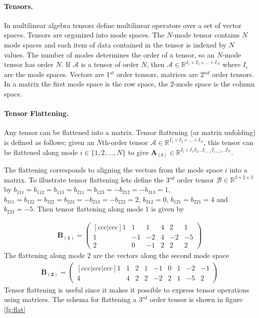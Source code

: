 \documentclass[11pt,a4paper]{report}
\begin{document}
\paragraph{Tensors.} In multilinear algebra tensors
define multilinear operators over a set of vector
spaces. Tensors are organized into mode spaces. The $N$-mode tensor contains $N$
mode spaces and each item of data contained in the tensor is indexed by $N$
values. The number of modes determines the order of a tensor, so an $N$-mode tensor has order $N$. If
$\mathcal{A}$ is a tensor of
order $N$, then $\mathcal{A} \in \mathbb{R}^{I_1 \times I_2 \times \ldots \times
  I_N}$ where $I_i$ are the mode spaces. Vectors are 1$^{st}$ order tensors, matrices are 2$^{nd}$ order
tensors. In a matrix the first mode space is the row space, the $2$-mode space
is the column space.

\paragraph{Tensor Flattening.} Any tensor can be flattened into a matrix. Tensor
flattening (or matrix unfolding) is defined as follows; given
an $N$th-order tensor $\mathcal{A} \in \mathbb{R}^{I_1 \times I_2 \times \ldots
  \times I_N}$, this tensor can be flattened along mode $i \in
\{1,2,\ldots,N\}$ to give $\mathbf{A_{(i)}} \in \mathbb{R}^{I_i \times I_1 I_2 \ldots I_{i-1} I_{i+1} \ldots I_N}$. 

The flattening corresponds to aligning the vectors from the mode space $i$ into a matrix. To illustrate tensor flattening lets define the 3$^{rd}$ order
  tensor $\mathcal{B} \in \mathbb{R}^{3\times 2\times 3}$ by $b_{111} = b_{112}
  = b_{113} = b_{211} = b_{123} = -b_{212} = -b_{313} = 1$, $b_{311} = b_{122} =
  b_{322} = b_{323} = -b_{213} = -b_{222} = 2$, $b_{312} = 0$, $b_{121} =
  b_{221} = 4$ and $b_{223} = -5$. Then tensor flattening along mode $1$ is given by

\begin{align*}
\mathbf{B_{(1)}} = 
\begin{pmatrix}[ccc|ccc]
1&1&1&4&2&1\\
1&-1&-2&4&-2&-5\\
2&0&-1&2&2&2
\end{pmatrix}
\end{align*}
The flattening along mode $2$ are the vectors along the second mode space
\begin{align*}
\mathbf{B_{(2)}} = 
\begin{pmatrix}[ccc|ccc|ccc]
1&1&2&1&-1&0&1&-2&-1\\
4&4&2&2&-2&2&1&-5&2
\end{pmatrix}
\end{align*}
Tensor flattening is useful since it makes it possible to express tensor
operations using matrices. The schema for flattening a 3$^{rd}$ order tensor is shown in figure \ref{fg:flat}
\end{document}
